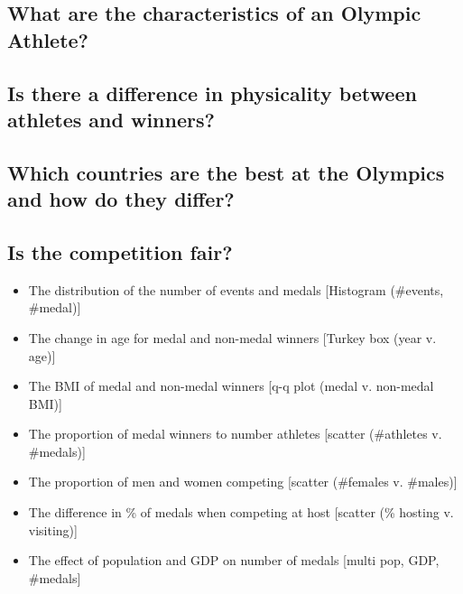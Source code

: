 \documentclass[a4 paper, 12pt]{article}
\begin{document}
\subsection{What are the characteristics of an Olympic Athlete?}

\subsection{Is there a difference in physicality between athletes and winners?}
\subsection{Which countries are the best at the Olympics and how do they differ?}
\subsection{Is the competition fair?}




    \begin{itemize}
        \item The distribution of the number of events and medals [Histogram (\#events, \#medal)]
        


        
        \item The change in age for medal and non-medal winners [Turkey box (year v. age)]
        \item The BMI of medal and non-medal winners [q-q plot (medal v. non-medal BMI)]
        \item The proportion of medal winners to number athletes [scatter (\#athletes v. \#medals)]
        \item The proportion of men and women competing [scatter (\#females v. \#males)]
        \item The difference in \% of medals when competing at host [scatter (\% hosting v. visiting)]
        \item The effect of population and GDP on number of medals [multi \- pop, GDP, \#medals]
    \end{itemize}




\pagebreak
\appendix
\addappheadtotoc
\appendixpage
\end{document}
